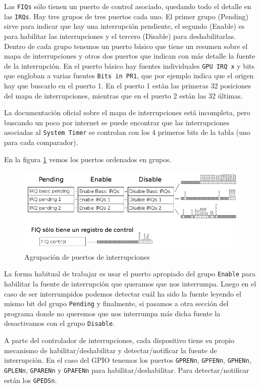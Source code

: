 Las {\tt FIQs} sólo tienen un puerto de control asociado, quedando todo el detalle
en las {\tt IRQs}. Hay tres grupos de tres
puertos cada uno. El primer grupo (Pending) sirve para indicar que hay una interrupción
pendiente, el segundo (Enable) es para habilitar las interrupciones y el tercero (Disable)
para deshabilitarlas. Dentro de cada grupo tenemos un puerto básico que tiene un resumen
sobre el mapa de interrupciones y otros dos puertos que
indican con más detalle la fuente de la interrupción. En el puerto básico
hay fuentes individuales {\tt GPU IRQ x} y bits que engloban a varias fuentes {\tt Bits in PR1},
que por ejemplo indica que el origen hay que buscarlo en el puerto 1. En el puerto 1 están
las primeras 32 posiciones del mapa de interrupciones, mientras que en el puerto 2 están
las 32 últimas.

La documentación oficial sobre el mapa de interrupciones está incompleta, pero buscando un poco
por internet se puede encontrar que las interrupciones asociadas al {\tt System Timer} se
controlan con los 4 primeros bits de la tabla (uno para cada comparador).

En la figura \ref{fig:interrupcionesgrupos} vemos los puertos ordenados en grupos.

\begin{figure}[h]
  \centering
    \includegraphics[width=15cm]{graphs/interrupcionesgrupos.png}
  \caption{Agrupación de puertos de interrupciones}
  \label{fig:interrupcionesgrupos}
\end{figure}

La forma habitual de trabajar es usar el puerto apropiado del grupo {\tt Enable} para
habilitar la fuente de interrupción que queramos que nos interrumpa. Luego en el caso de
ser interrumpidos podemos detectar cuál ha sido la fuente leyendo el mismo bit del
grupo {\tt Pending} y finalmente, si pasamos a otra sección del programa donde no queremos
que nos interrumpa más dicha fuente la desactivamos con el grupo {\tt Disable}.

A parte del controlador de interrupciones, cada dispositivo tiene su propio mecanismo de
habilitar/deshabilitar y detectar/notificar la fuente de interrupción. En el caso del GPIO tenemos
los puertos {\tt GPRENn}, {\tt GPFENn}, {\tt GPHENn}, {\tt GPLENn}, {\tt GPARENn} y {\tt GPAFENn}
para habilitar/deshabilitar. Para detectar/notificar están los {\tt GPEDSn}.

